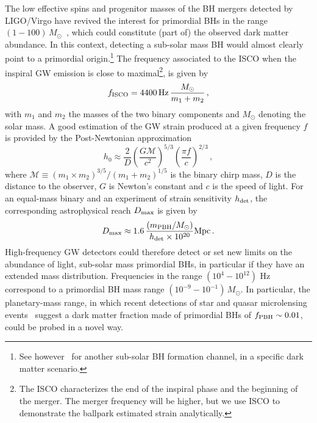 \documentclass[11pt,a4paper]{article}
\newcommand{\be}{\begin{equation}}
\newcommand{\ee}{\end{equation}}
\begin{document}
The low effective spins and progenitor masses of the BH mergers detected by LIGO/Virgo have revived the interest for primordial BHs in the range $(1-100) \, M_\odot$~\cite{Bird:2016dcv,Clesse:2016vqa,Sasaki:2016jop}, which could constitute (part of) the observed dark matter abundance. In this context, detecting a sub-solar mass BH would almost clearly point to a primordial origin.\footnote{See however~\cite{Kouvaris:2018wnh} for another sub-solar BH formation channel, in a specific dark matter scenario.}  The frequency associated to the ISCO when the inspiral GW emission is close to maximal\footnote{The ISCO characterizes the end of the inspiral phase and the beginning of the merger. The merger frequency will be higher, but we use ISCO to demonstrate the ballpark estimated strain analytically.}, is given by
\be
f_{\rm ISCO} = 4400 \, {\rm Hz} \, \frac{M_\odot}{m_1 + m_2} \,,
\label{eq:fISCO-PBH}
\ee
with $m_1$ and $m_2$ the masses of the two binary components and $M_\odot$ denoting the solar mass. A good estimation of the GW strain produced at a given frequency $f$ is provided by the Post-Newtonian approximation~\cite{Antelis:2018sfj}
\be \label{eq:strainPBHs}
h_0 \approx \frac{2}{D} \left( \frac{G \mathcal M }{c^2}  \right)^{5/3} \left( \frac{ \pi f}{c} \right)^{2/3}  \,,
\ee
where $\mathcal M \equiv (m_1 \times m_2)^{3/5}/(m_1+m_2)^{1/5} $ is the binary chirp mass,  $D$ is the distance to the observer, $G$ is Newton's constant and $c$ is the speed of light. For an equal-mass binary and an experiment of strain sensitivity $h_{\rm det}$,  the corresponding astrophysical reach $D_{\rm max}$ is given by
\be
D_{\rm max} \approx 1.6  \, \frac{(m_{\rm PBH}/M_\odot) }{h_{\rm det} \times 10^{20}} {\rm Mpc} \,.
\label{eq:h0-PBH}
\ee
High-frequency GW detectors could therefore detect or set new limits on the abundance of light, sub-solar mass primordial BHs, in particular if they have an extended mass distribution. Frequencies in the range $(10^4 - 10^{12})$ Hz correspond to a primordial BH mass range $(10^{-9} - 10^{-1}) \, M_\odot$. In particular, the planetary-mass range, in which recent detections of star and quasar microlensing events~\cite{Niikura:2019kqi,Hawkins:2020zie,2019ApJ...885...77B} suggest a dark matter fraction made of primordial BHs of $f_{\rm PBH} \sim 0.01$, could be probed in a novel way.
\end{document}
